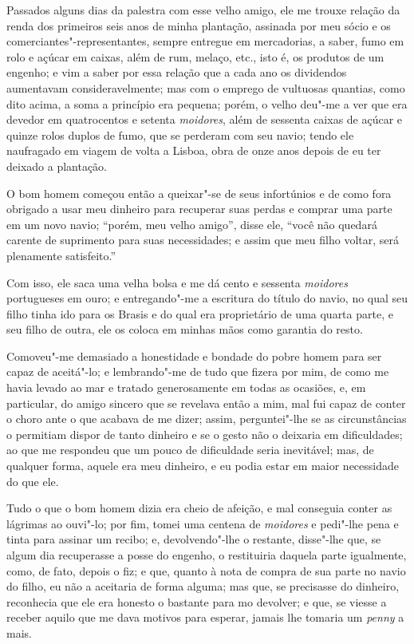 Passados alguns dias da palestra com esse velho amigo, ele me trouxe
relação da renda dos primeiros seis anos de minha plantação, assinada
por meu sócio e os comerciantes"-representantes, sempre entregue em
mercadorias, a saber, fumo em rolo e açúcar em caixas, além de rum,
melaço, etc., isto é, os produtos de um engenho; e vim a saber por essa
relação que a cada ano os dividendos aumentavam consideravelmente; mas
com o emprego de vultuosas quantias, como dito acima, a soma a princípio
era pequena; porém, o velho deu"-me a ver que era devedor em quatrocentos
e setenta \emph{moidores}, além de sessenta caixas de açúcar e quinze
rolos duplos de fumo, que se perderam com seu navio; tendo ele
naufragado em viagem de volta a Lisboa, obra de onze anos depois de eu
ter deixado a plantação.

O bom homem começou então a queixar"-se de seus infortúnios e de como
fora obrigado a usar meu dinheiro para recuperar suas perdas e comprar
uma parte em um novo navio; ``porém, meu velho amigo'', disse ele,
``você não quedará carente de suprimento para suas necessidades; e assim
que meu filho voltar, será plenamente satisfeito.''

Com isso, ele saca uma velha bolsa e me dá cento e sessenta
\emph{moidores} portugueses em ouro; e entregando"-me a escritura do
título do navio, no qual seu filho tinha ido para os Brasis e do qual
era proprietário de uma quarta parte, e seu filho de outra, ele os
coloca em minhas mãos como garantia do resto.

Comoveu"-me demasiado a honestidade e bondade do pobre homem para ser
capaz de aceitá"-lo; e lembrando"-me de tudo que fizera por mim, de como
me havia levado ao mar e tratado generosamente em todas as ocasiões, e,
em particular, do amigo sincero que se revelava então a mim, mal fui
capaz de conter o choro ante o que acabava de me dizer; assim,
perguntei"-lhe se as circunstâncias o permitiam dispor de tanto dinheiro
e se o gesto não o deixaria em dificuldades; ao que me respondeu que um
pouco de dificuldade seria inevitável; mas, de qualquer forma, aquele
era meu dinheiro, e eu podia estar em maior necessidade do que ele.

Tudo o que o bom homem dizia era cheio de afeição, e mal conseguia
conter as lágrimas ao ouvi"-lo; por fim, tomei uma centena de
\emph{moidores} e pedi"-lhe pena e tinta para assinar um recibo; e,
devolvendo"-lhe o restante, disse"-lhe que, se algum dia recuperasse a
posse do engenho, o restituiria daquela parte igualmente, como, de fato,
depois o fiz; e que, quanto à nota de compra de sua parte no navio do
filho, eu não a aceitaria de forma alguma; mas que, se precisasse do
dinheiro, reconhecia que ele era honesto o bastante para mo devolver; e
que, se viesse a receber aquilo que me dava motivos para esperar, jamais
lhe tomaria um \emph{penny} a mais.

